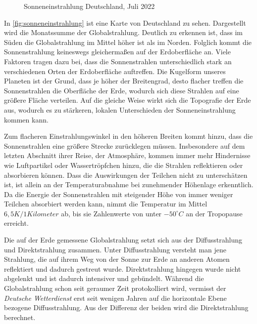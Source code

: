 \documentclass[12pt, a4paper]{article}
\begin{document}
\begin{figure}
\centering
\def\svgwidth{350pt}

\caption{Sonneneinstrahlung Deutschland, Juli 2022}
\label{fig:sonneneinstrahlung}
\end {figure}

In \autoref{fig:sonneneinstrahlung} ist eine Karte von Deutschland zu sehen. Dargestellt wird die Monatssumme der Globalstrahlung. Deutlich zu erkennen ist, dass im Süden die Globalstrahlung im Mittel höher ist als im Norden. Folglich kommt die Sonnenstrahlung keineswegs gleichermaßen auf der Erdoberfläche an. Viele Faktoren tragen dazu bei, dass die Sonnenstrahlen unterschiedlich stark an verschiedenen Orten der Erdoberfläche auftreffen. Die Kugelform unseres Planeten ist der Grund, dass je höher der Breitengrad, desto flacher treffen die Sonnenstrahlen die Oberfläche der Erde, wodurch sich diese Strahlen auf eine größere Fläche verteilen. Auf die gleiche Weise wirkt sich die Topografie der Erde aus, wodurch es zu stärkeren, lokalen Unterschieden der Sonneneinstrahlung kommen kann.

Zum flacheren Einstrahlungswinkel in den höheren Breiten kommt hinzu, dass die Sonnenstrahlen eine größere Strecke zurücklegen müssen. Insbesondere auf dem letzten Abschnitt ihrer Reise, der Atmosphäre, kommen immer mehr Hindernisse wie Luftpartikel oder Wassertröpfchen hinzu, die die Strahlen reflektieren oder absorbieren können. Dass die Auswirkungen der Teilchen nicht zu unterschätzen ist, ist allein an der Temperaturabnahme bei zunehmender Höhenlage erkenntlich. Da die Energie der Sonnenstrahlen mit steigender Höhe von immer weniger Teilchen absorbiert werden kann, nimmt die Temperatur im Mittel $6,5 K/ 1 Kilometer$  ab, bis sie Zahlenwerte von unter $-50 ^\circ C$ an der Tropopause erreicht.


Die auf der Erde gemessene Globalstrahlung setzt sich aus der Diffusstrahlung und Direktstrahlung zusammen. Unter Diffusstrahlung versteht man jene Strahlung, die auf ihrem Weg von der Sonne zur Erde an anderen Atomen reflektiert und dadurch gestreut wurde. Direktstrahlung hingegen wurde nicht abgelenkt und ist dadurch intensiver und gebündelt. Während die Globalstrahlung schon seit geraumer Zeit protokolliert wird,  vermisst der \textit{Deutsche Wetterdienst} erst seit wenigen Jahren auf die horizontale Ebene bezogene Diffusstrahlung. Aus der Differenz der beiden wird die Direktstrahlung berechnet. 
\end{document}
